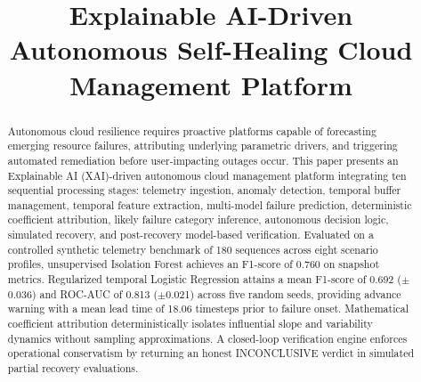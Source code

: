 \documentclass[conference]{IEEEtran}
\begin{document}
\title{Explainable AI-Driven Autonomous Self-Healing Cloud Management Platform}

\author{
\and
{}
}

\maketitle

\begin{abstract}
Autonomous cloud resilience requires proactive platforms capable of forecasting emerging resource failures, attributing underlying parametric drivers, and triggering automated remediation before user-impacting outages occur. This paper presents an Explainable AI (XAI)-driven autonomous cloud management platform integrating ten sequential processing stages: telemetry ingestion, anomaly detection, temporal buffer management, temporal feature extraction, multi-model failure prediction, deterministic coefficient attribution, likely failure category inference, autonomous decision logic, simulated recovery, and post-recovery model-based verification. Evaluated on a controlled synthetic telemetry benchmark of 180 sequences across eight scenario profiles, unsupervised Isolation Forest achieves an F1-score of 0.760 on snapshot metrics. Regularized temporal Logistic Regression attains a mean F1-score of 0.692 ($\pm$0.036) and ROC-AUC of 0.813 ($\pm$0.021) across five random seeds, providing advance warning with a mean lead time of 18.06 timesteps prior to failure onset. Mathematical coefficient attribution deterministically isolates influential slope and variability dynamics without sampling approximations. A closed-loop verification engine enforces operational conservatism by returning an honest INCONCLUSIVE verdict in simulated partial recovery evaluations.
\end{abstract}
\end{document}
